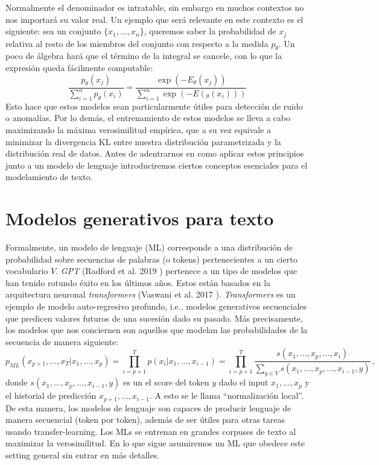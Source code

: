 \documentclass[letterpaper,11pt,oneside]{article}
\theoremstyle{break}
\begin{document}
Normalmente el denominador es intratable, sin embargo en muchos contextos no nos importará su valor real. Un ejemplo que será relevante en este contexto es el siguiente: sea un conjunto $\{x_1,\dots,x_n\}$, queremos saber la probabilidad de $x_j$ relativa al resto de los miembros del conjunto con respecto a la medida $p_\theta$. Un poco de álgebra hará que el término de la integral se cancele, con lo que la expresión queda fácilmente computable:
\begin{equation}
\label{eq:importance}
    \frac{p_\theta(x_j)}{\sum_{i=1}^np_\theta(x_i)} = \frac{\exp(-E_\theta(x_j))}{\sum_{i=1}^n\exp(-E(_\theta(x_i)))}
\end{equation}
Esto hace que estos modelos sean particularmente útiles para detección de ruido o anomalías. Por lo demás, el entrenamiento de estos modelos se lleva a cabo maximizando la máxima verosimilitud empírica, que a su vez equivale a minimizar la divergencia KL entre nuestra distribución parametrizada y la distribución real de datos. Antes de adentrarnos en como aplicar estos principios junto a un modelo de lenguaje introduciremos ciertos conceptos esenciales para el modelamiento de texto.

\section{Modelos generativos para texto}
\iffalse
\subsection{Modelos de lenguaje}
\fi
Formalmente, un modelo de lenguaje (ML) corresponde a una distribución de probabilidad sobre secuencias de palabras (o tokens) pertenecientes a un cierto vocabulario $V$. %
\textit{GPT} (Radford et al. 2019 \cite{gpt}) pertenece a un tipo de modelos que han tenido rotundo éxito en los últimos años. Estos están basados en la arquitectura neuronal \textit{transformers} (Vaswani et al. 2017 \cite{transformer}). \textit{Transformers} es un ejemplo de modelo auto-regresivo profundo, i.e., modelos generativos secuenciales que predicen valores futuros de una sucesión dado su pasado. Más precisamente, los modelos que nos conciernen son aquellos que modelan las probabilidades de la secuencia de manera siguiente:
\begin{equation}
\label{eq:local_norm}
    p_{ML}(x_{p+1},\dots,x_T|x_1,\dots,x_p) = \prod_{i=p+1}^T p(x_i|x_1,\dots,x_{i-1}) = \prod_{i=p+1}^T \frac{s(x_1,\dots,x_p,\dots,x_{i})}{\sum_{y\in V}s(x_1,\dots,x_p,\dots,x_{i-1},y)}\,,
\end{equation}
donde $s(x_1,\dots,x_p,\dots,x_{i-1},y)$ es un el score del token $y$ dado el input $x_1,\dots,x_p$ y el historial de predicción $x_{p+1},\dots,x_{i-1}$. A esto se le llama ``normalización local''. De esta manera, los modelos de lenguaje son capaces de producir lenguaje de manera secuencial (token por token), además de ser útiles para otras tareas usando transfer-learning. Los MLs se entrenan en grandes corpuses de texto al maximizar la verosimilitud. En lo que sigue asumiremos un ML que obedece este setting general sin entrar en más detalles.
\end{document}
